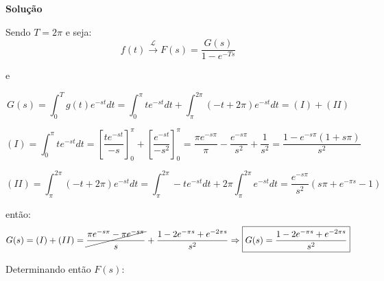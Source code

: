 \linespread{1.5}

\textbf{Solução}

Sendo $T = 2\pi$ e seja:
\begin{equation*}
    f(t) \xrightarrow{\mathcal{L}} F(s) = \frac{G(s)}{1-e^{-Ts}}
\end{equation*}

e 

\begin{equation*}
    G(s) = \int_0^T g(t)e^{-st}dt = \int_0^\pi te^{-st}dt + \int_\pi^{2\pi} (-t+2\pi)e^{-st}dt = (I) + (II)
\end{equation*}

\begin{equation*}
    (I) = \int_0^\pi te^{-st}dt = \left[\frac{te^{-st}}{-s}\right]^\pi_0 + \left[\frac{e^{-st}}{-s^2}\right]^\pi_0 = \frac{\pi e^{-s\pi}}{\pi} - \frac{e^{-s\pi}}{s^2} + \frac{1}{s^2} = \frac{1-e^{-s\pi}(1+s\pi)}{s^2}
\end{equation*}

\begin{equation*}
    (II) = \int_\pi^{2\pi} (-t+2\pi)e^{-st}dt = \int_\pi^{2\pi}-te^{-st}dt + 2\pi\int_\pi^{2\pi}e^{-st}dt = \frac{e^{-s\pi}}{s^2}(s\pi+e^{-\pi s} - 1)
\end{equation*}

então:
\begin{equation*}
    G(s) = (I) + (II) = \cancel{\frac{\pi e^{-s\pi}-\pi e^{-s\pi}}{s}} + \frac{1 - 2e^{-\pi s} + e^{-2\pi s}}{s^2} \Rightarrow \boxed{G(s) = \frac{1 - 2e^{-\pi s} + e^{-2\pi s}}{s^2} } 
\end{equation*}

Determinando então $F(s)$:
